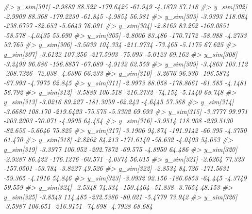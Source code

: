 \documentclass[
  10pt,
  italian,
  a4paper,
  extrafontsizes,onecolumn,openright
  ]{memoir}
\newenvironment{Shaded}{\begin{snugshade}}{\end{snugshade}}
\newcommand{\CommentTok}[1]{\textcolor[rgb]{0.56,0.35,0.01}{\textit{#1}}}
\begin{document}
\begin{Shaded}
\begin{Highlighting}[]
\CommentTok{\#\textgreater{}   y\_sim[301] {-}2.9889  88.522 {-}179.6425 {-}61.949 {-}4.1879 57.118}
\CommentTok{\#\textgreater{}   y\_sim[302] {-}2.9909  88.368 {-}179.2230 {-}61.845 {-}4.9854 56.981}
\CommentTok{\#\textgreater{}   y\_sim[303] {-}3.9393 118.084 {-}238.6757 {-}82.653 {-}5.6643 76.091}
\CommentTok{\#\textgreater{}   y\_sim[304] {-}2.8169  83.262 {-}169.0851 {-}58.578 {-}4.0435 53.690}
\CommentTok{\#\textgreater{}   y\_sim[305] {-}2.8006  83.486 {-}170.7172 {-}58.088 {-}4.2733 53.765}
\CommentTok{\#\textgreater{}   y\_sim[306] {-}3.5039 104.334 {-}211.9734 {-}73.465 {-}5.1175 67.625}
\CommentTok{\#\textgreater{}   y\_sim[307] {-}3.6122 107.256 {-}217.5903 {-}75.093 {-}5.0123 69.162}
\CommentTok{\#\textgreater{}   y\_sim[308] {-}3.2499  96.686 {-}196.8857 {-}67.689 {-}4.9132 62.559}
\CommentTok{\#\textgreater{}   y\_sim[309] {-}3.4863 103.112 {-}208.7226 {-}72.038 {-}4.6396 66.233}
\CommentTok{\#\textgreater{}   y\_sim[310] {-}3.2676  96.930 {-}196.5874 {-}67.993 {-}4.7975 62.845}
\CommentTok{\#\textgreater{}   y\_sim[311] {-}2.9973  88.058 {-}178.8661 {-}61.585 {-}4.1481 56.792}
\CommentTok{\#\textgreater{}   y\_sim[312] {-}3.5889 106.518 {-}216.2732 {-}74.154 {-}5.1440 68.748}
\CommentTok{\#\textgreater{}   y\_sim[313] {-}3.0216  89.227 {-}181.3059 {-}62.243 {-}4.6445 57.368}
\CommentTok{\#\textgreater{}   y\_sim[314] {-}3.6680 108.170 {-}219.6423 {-}75.575 {-}5.3302 69.693}
\CommentTok{\#\textgreater{}   y\_sim[315] {-}3.3777  99.971 {-}203.2003 {-}70.071 {-}4.9905 64.454}
\CommentTok{\#\textgreater{}   y\_sim[316] {-}3.9514 118.008 {-}239.5130 {-}82.655 {-}5.6646 75.825}
\CommentTok{\#\textgreater{}   y\_sim[317] {-}3.1906  94.874 {-}191.9142 {-}66.395 {-}4.3750 61.470}
\CommentTok{\#\textgreater{}   y\_sim[318] {-}2.8262  84.213 {-}171.6140 {-}58.632 {-}4.0403 54.053}
\CommentTok{\#\textgreater{}   y\_sim[319] {-}3.3977 100.052 {-}202.7872 {-}69.575 {-}4.8950 64.486}
\CommentTok{\#\textgreater{}   y\_sim[320] {-}2.9287  86.422 {-}176.1276 {-}60.571 {-}4.0374 56.015}
\CommentTok{\#\textgreater{}   y\_sim[321] {-}2.6264  77.323 {-}157.0501 {-}53.784 {-}3.8227 49.526}
\CommentTok{\#\textgreater{}   y\_sim[322] {-}2.8534  84.726 {-}171.5631 {-}59.365 {-}4.1916 54.846}
\CommentTok{\#\textgreater{}   y\_sim[323] {-}3.0932  92.156 {-}186.6853 {-}64.445 {-}4.3749 59.559}
\CommentTok{\#\textgreater{}   y\_sim[324] {-}2.5348  74.334 {-}150.4464 {-}51.838 {-}3.7654 48.153}
\CommentTok{\#\textgreater{}   y\_sim[325] {-}3.8549 114.485 {-}232.5386 {-}80.021 {-}5.4779 73.942}
\CommentTok{\#\textgreater{}   y\_sim[326] {-}3.5987 106.651 {-}216.9151 {-}74.698 {-}4.7928 68.684}

\end{Highlighting}
\end{Shaded}
\end{document}
